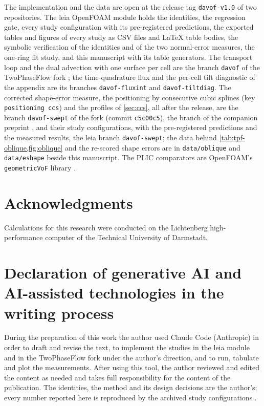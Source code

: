 \documentclass[preprint,12pt]{elsarticle}
\begin{document}
The implementation and the data are open at the release tag \texttt{davof-v1.0} of two repositories. The leia OpenFOAM module \citep{LeiaRepo2026} holds the identities, the regression gate, every study configuration with its pre-registered predictions, the exported tables and figures of every study as CSV files and \LaTeX{} table bodies, the symbolic verification of the identities and of the two normal-error measures, the one-ring fit study, and this manuscript with its table generators. The transport loop and the dual advection with one surface per cell are the branch \texttt{davof} of the TwoPhaseFlow fork \citep{TwoPhaseFlowFork2026}; the time-quadrature flux and the per-cell tilt diagnostic of the appendix are its branches \texttt{davof-fluxint} and \texttt{davof-tiltdiag}. The corrected shape-error measure, the positioning by consecutive cubic splines (key \texttt{positioning ccs}) and the profiles of \cref{sec:ccs}, all after the release, are the branch \texttt{davof-swept} of the fork (commit \texttt{c5c00c5}), the branch of the companion preprint \citep{MaricSweptAdvection2026}, and their study configurations, with the pre-registered predictions and the measured results, the leia branch \texttt{davof-swept}; the data behind \cref{tab:tpf-oblique,fig:oblique} and the re-scored shape errors are in \texttt{data/oblique} and \texttt{data/eshape} beside this manuscript. The PLIC comparators are OpenFOAM's \texttt{geometricVoF} library \citep{ScheuflerRoenby2023TwoPhaseFlow}.

\section*{Acknowledgments}

Calculations for this research were conducted on the Lichtenberg high-performance computer of the Technical University of Darmstadt.

\section*{Declaration of generative AI and AI-assisted technologies in the writing process}

During the preparation of this work the author used Claude Code (Anthropic) in order to draft and revise the text, to implement the studies in the leia module and in the TwoPhaseFlow fork under the author's direction, and to run, tabulate and plot the measurements. After using this tool, the author reviewed and edited the content as needed and takes full responsibility for the content of the publication. The identities, the method and its design decisions are the author's; every number reported here is reproduced by the archived study configurations \citep{LeiaRepo2026,TwoPhaseFlowFork2026}.
\end{document}
